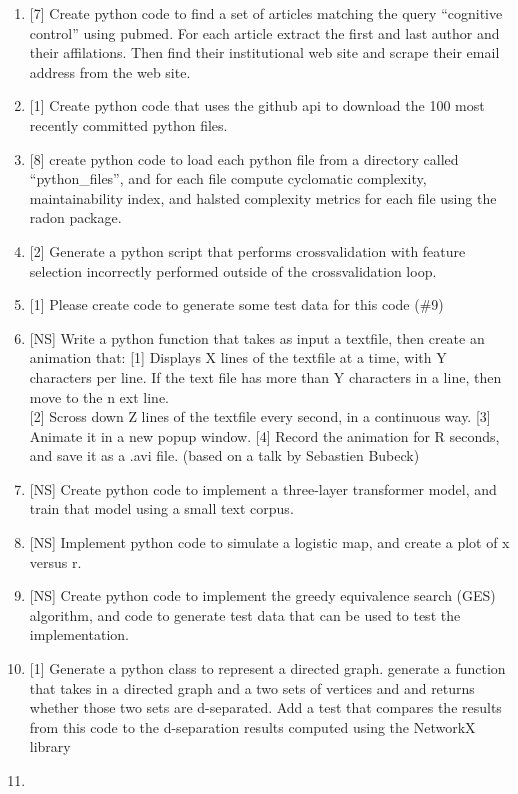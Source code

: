 \documentclass[
]{article}
\begin{document}
\begin{enumerate}
\item
  {[}7{]} Create python code to find a set of articles matching the
  query ``cognitive control'' using pubmed. For each article extract the
  first and last author and their affilations. Then find their
  institutional web site and scrape their email address from the web
  site.
\item
  {[}1{]} Create python code that uses the github api to download the
  100 most recently committed python files.
\item
  {[}8{]} create python code to load each python file from a directory
  called ``python\_files'', and for each file compute cyclomatic
  complexity, maintainability index, and halsted complexity metrics for
  each file using the radon package.
\item
  {[}2{]} Generate a python script that performs crossvalidation with
  feature selection incorrectly performed outside of the crossvalidation
  loop.
\item
  {[}1{]} Please create code to generate some test data for this code
  (\#9)
\item
  {[}NS{]} Write a python function that takes as input a textfile, then
  create an animation that: {[}1{]} Displays X lines of the textfile at
  a time, with Y characters per line. If the text file has more than Y
  characters in a line, then move to the n ext line.\\
  {[}2{]} Scross down Z lines of the textfile every second, in a
  continuous way. {[}3{]} Animate it in a new popup window. {[}4{]}
  Record the animation for R seconds, and save it as a .avi file. (based
  on a talk by Sebastien Bubeck)
\item
  {[}NS{]} Create python code to implement a three-layer transformer
  model, and train that model using a small text corpus.
\item
  {[}NS{]} Implement python code to simulate a logistic map, and create
  a plot of x versus r.
\item
  {[}NS{]} Create python code to implement the greedy equivalence search
  (GES) algorithm, and code to generate test data that can be used to
  test the implementation.
\item
  {[}1{]} Generate a python class to represent a directed graph.
  generate a function that takes in a directed graph and a two sets of
  vertices and and returns whether those two sets are d-separated. Add a
  test that compares the results from this code to the d-separation
  results computed using the NetworkX library
\item

\end{enumerate}
\end{document}

